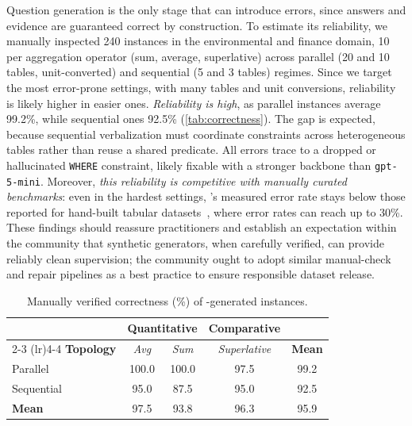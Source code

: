 Question generation is the only \name stage that can introduce errors, since answers and evidence are guaranteed correct by construction. To estimate its reliability, we manually inspected 240 instances in the environmental and finance domain, 10 per aggregation operator (sum, average, superlative) across parallel (20 and 10 tables, unit-converted) and sequential (5 and 3 tables) regimes. Since we target the most error-prone settings, with many tables and unit conversions, reliability is likely higher in easier ones. 
\emph{Reliability is high}, as parallel instances average 99.2\%, while sequential ones 92.5\% (\autoref{tab:correctness}). The gap is expected, because sequential verbalization must coordinate constraints across heterogeneous tables rather than reuse a shared predicate. All errors trace to a dropped or hallucinated \texttt{WHERE} constraint, likely fixable with a stronger backbone than \texttt{gpt-5-mini}. Moreover, \emph{this reliability is competitive with manually curated benchmarks}: even in the hardest settings, 
\name's measured error rate stays below those reported for hand-built tabular datasets~\cite{5.8}, where error rates can reach up to 30\%. These findings should reassure practitioners and establish an expectation within the community that synthetic generators, when carefully verified, can provide reliably clean supervision; the community ought to adopt similar manual-check and repair pipelines as a best practice to ensure responsible dataset release. 
\begin{table}[t!]
\centering
\small
\setlength{\tabcolsep}{0.55em}
\renewcommand{\arraystretch}{1.2}
\begin{tabular}{l ccc c}
\toprule
& \multicolumn{2}{c}{\textbf{Quantitative}} & \textbf{Comparative} & \\
\cmidrule(lr){2-3} \cmidrule(lr){4-4}
\textbf{Topology} & \textit{Avg} & \textit{Sum} & \textit{Superlative} & \textbf{Mean} \\
\midrule
Parallel    & 100.0 & 100.0 & 97.5 & 99.2 \\
Sequential  &  95.0 &  87.5 & 95.0 & 92.5 \\
\midrule
\textbf{Mean} & 97.5 & 93.8 & 96.3 & 95.9 \\
\bottomrule
\end{tabular}
\caption{Manually verified correctness (\%) of \name-generated instances.}
\label{tab:correctness}
\end{table} 

